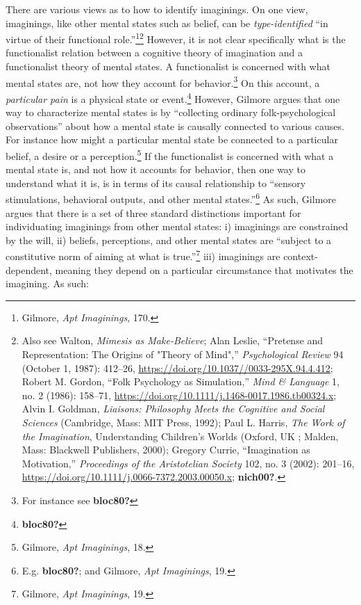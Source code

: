 \documentclass[
  12pt,
]{book}
\theoremstyle{definition}
\theoremstyle{definition}
\theoremstyle{definition}
\theoremstyle{definition}
\theoremstyle{remark}
\begin{document}
There are various views as to how to identify imaginings. On one view, imaginings, like other mental states such as belief, can be \emph{type-identified} ``in virtue of their functional role.''\footnote{Gilmore, \emph{Apt {Imaginings}}, 170.}\footnote{Also see Walton, \emph{Mimesis as {Make-Believe}}; Alan Leslie, {``Pretense and {Representation}: {The Origins} of "{Theory} of {Mind}",''} \emph{Psychological Review} 94 (October 1, 1987): 412--26, \url{https://doi.org/10.1037//0033-295X.94.4.412}; Robert M. Gordon, {``Folk Psychology as Simulation,''} \emph{Mind \& Language} 1, no. 2 (1986): 158--71, \url{https://doi.org/10.1111/j.1468-0017.1986.tb00324.x}; Alvin I. Goldman, \emph{Liaisons: Philosophy Meets the Cognitive and Social Sciences} (Cambridge, Mass: MIT Press, 1992); Paul L. Harris, \emph{The {Work} of the {Imagination}}, Understanding {Children}'s {Worlds} (Oxford, UK ; Malden, Mass: Blackwell Publishers, 2000); Gregory Currie, {``Imagination as Motivation,''} \emph{Proceedings of the Aristotelian Society} 102, no. 3 (2002): 201--16, \url{https://doi.org/10.1111/j.0066-7372.2003.00050.x}; \textbf{nich00?}.} However, it is not clear specifically what is the functionalist relation between a cognitive theory of imagination and a functionalist theory of mental states. A functionalist is concerned with what mental states are, not how they account for behavior.\footnote{For instance see \textbf{bloc80?}} On this account, a \emph{particular pain} is a physical state or event.\footnote{\textbf{bloc80?}} However, Gilmore argues that one way to characterize mental states is by ``collecting ordinary folk-psychological observations'' about how a mental state is causally connected to various causes. For instance how might a particular mental state be connected to a particular belief, a desire or a perception.\footnote{Gilmore, \emph{Apt {Imaginings}}, 18.} If the functionalist is concerned with what a mental state is, and not how it accounts for behavior, then one way to understand what it is, is in terms of its causal relationship to ``sensory stimulations, behavioral outputs, and other mental states.''\footnote{E.g. \textbf{bloc80?}; and Gilmore, \emph{Apt {Imaginings}}, 19.} As such, Gilmore argues that there is a set of three standard distinctions important for individuating imaginings from other mental states: i) imaginings are constrained by the will, ii) beliefs, perceptions, and other mental states are ``subject to a constitutive norm of aiming at what is true.''\footnote{Gilmore, \emph{Apt {Imaginings}}, 19.} iii) imaginings are context-dependent, meaning they depend on a particular circumstance that motivates the imagining. As such:
\end{document}
